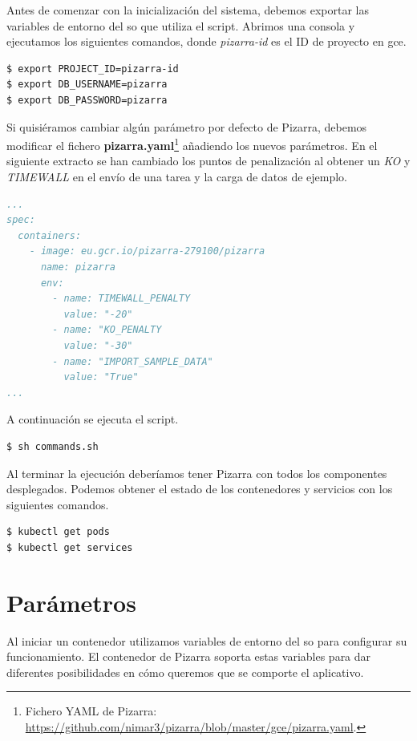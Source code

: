 \documentclass[11pt,spanish,listoffigures,listoftables]{tfgetsinf}
\begin{document}
Antes de comenzar con la inicialización del sistema, debemos exportar las variables de entorno del \acrshort{so} que utiliza el script. Abrimos una consola y ejecutamos los siguientes comandos, donde \textit{pizarra-id} es el ID de proyecto en \acrfull{gce}.

\begin{lstlisting}[language=bash]
$ export PROJECT_ID=pizarra-id
$ export DB_USERNAME=pizarra
$ export DB_PASSWORD=pizarra
\end{lstlisting}

Si quisiéramos cambiar algún parámetro por defecto de Pizarra, debemos modificar el fichero \textbf{pizarra.yaml}\footnote{Fichero YAML de Pizarra: \url{https://github.com/nimar3/pizarra/blob/master/gce/pizarra.yaml}.} añadiendo los nuevos parámetros. En el siguiente extracto se han cambiado los puntos de penalización al obtener un \textit{KO} y \textit{TIMEWALL} en el envío de una \Gls{tarea} y la carga de datos de ejemplo.

\begin{lstlisting}[language=yaml]
...
spec:
  containers:
    - image: eu.gcr.io/pizarra-279100/pizarra
      name: pizarra
      env:
        - name: TIMEWALL_PENALTY
          value: "-20"
        - name: "KO_PENALTY
          value: "-30"
        - name: "IMPORT_SAMPLE_DATA"
          value: "True"
...          
\end{lstlisting}

A continuación se ejecuta el script.

\begin{lstlisting}[language=bash]
$ sh commands.sh
\end{lstlisting}

Al terminar la ejecución deberíamos tener Pizarra con todos los componentes desplegados. Podemos obtener el estado de los contenedores y servicios con los siguientes comandos.

\begin{lstlisting}[language=bash]
$ kubectl get pods
$ kubectl get services
\end{lstlisting}

\section{Parámetros}

Al iniciar un \Gls{contenedor} utilizamos variables de entorno del \acrshort{so} para configurar su funcionamiento. El \Gls{contenedor} de Pizarra soporta estas variables para dar diferentes posibilidades en cómo queremos que se comporte el aplicativo. 
\end{document}
